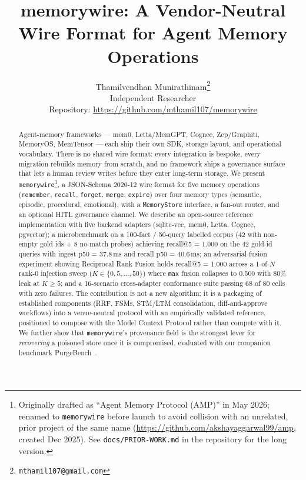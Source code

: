 \documentclass[11pt,letterpaper,twocolumn]{article}
\title{memorywire: A Vendor-Neutral Wire Format for Agent Memory Operations}
\author{
  Thamilvendhan Munirathinam\thanks{\texttt{mthamil107@gmail.com}}\\
  Independent Researcher\\
  \small{Repository: \url{https://github.com/mthamil107/memorywire}}
}
\date{}
\begin{document}
\maketitle

\begin{abstract}
Agent-memory frameworks --- mem0, Letta/MemGPT, Cognee, Zep/Graphiti, MemoryOS, MemTensor --- each ship their own SDK, storage layout, and operational vocabulary. There is no shared wire format: every integration is bespoke, every migration rebuilds memory from scratch, and no framework ships a governance surface that lets a human review writes before they enter long-term storage. We present \texttt{memorywire}\footnote{Originally drafted as ``Agent Memory Protocol (AMP)'' in May 2026; renamed to \texttt{memorywire} before launch to avoid collision with an unrelated, prior project of the same name (\url{https://github.com/akshayaggarwal99/amp}, created Dec 2025). See \texttt{docs/PRIOR-WORK.md} in the repository for the long version.}, a JSON-Schema 2020-12 wire format for five memory operations (\texttt{remember}, \texttt{recall}, \texttt{forget}, \texttt{merge}, \texttt{expire}) over four memory types (semantic, episodic, procedural, emotional), with a \texttt{MemoryStore} interface, a fan-out router, and an optional HITL governance channel. We describe an open-source reference implementation with five backend adapters (sqlite-vec, mem0, Letta, Cognee, pgvector); a microbenchmark on a 100-fact / 50-query labelled corpus (42 with non-empty gold ids + 8 no-match probes) achieving recall@5 = 1.000 on the 42 gold-id queries with ingest p50 = 37.8\,ms and recall p50 = 40.6\,ms; an adversarial-fusion experiment showing Reciprocal Rank Fusion holds recall@5 = 1.000 across a 1-of-$N$ rank-0 injection sweep ($K \in \{0,5,\dots,50\}$) where \texttt{max} fusion collapses to 0.500 with 80\% leak at $K \geq 5$; and a 16-scenario cross-adapter conformance suite passing 68 of 80 cells with zero failures. The contribution is not a new algorithm; it is a packaging of established components (RRF, FSMs, STM/LTM consolidation, diff-and-approve workflows) into a venue-neutral protocol with an empirically validated reference, positioned to compose with the Model Context Protocol rather than compete with it. We further show that \texttt{memorywire}'s provenance field is the strongest lever for \emph{recovering} a poisoned store once it is compromised, evaluated with our companion benchmark PurgeBench~\cite{purgebench}.
\end{abstract}
\end{document}
